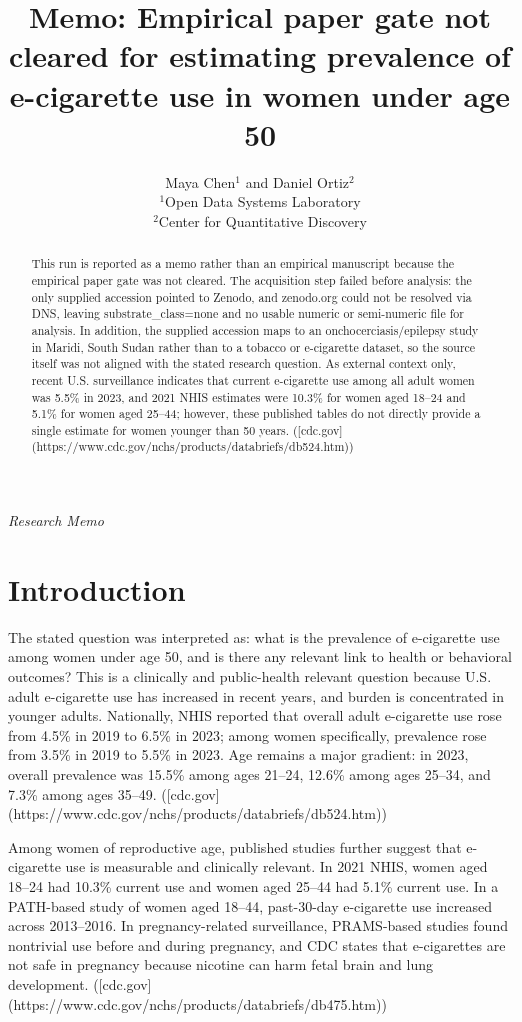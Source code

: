 \documentclass[11pt]{article}
\title{Memo: Empirical paper gate not cleared for estimating prevalence of e-cigarette use in women under age 50}
\author{Maya Chen$^{1}$ and Daniel Ortiz$^{2}$\\$^{1}$Open Data Systems Laboratory\\$^{2}$Center for Quantitative Discovery}
\date{}
\begin{document}
\maketitle

\begin{center}\small\textit{Research Memo}\end{center}

\begin{abstract}

This run is reported as a memo rather than an empirical manuscript because the empirical paper gate was not cleared. The acquisition step failed before analysis: the only supplied accession pointed to Zenodo, and zenodo.org could not be resolved via DNS, leaving substrate\_class=none and no usable numeric or semi-numeric file for analysis. In addition, the supplied accession maps to an onchocerciasis/epilepsy study in Maridi, South Sudan rather than to a tobacco or e-cigarette dataset, so the source itself was not aligned with the stated research question. As external context only, recent U.S. surveillance indicates that current e-cigarette use among all adult women was 5.5\% in 2023, and 2021 NHIS estimates were 10.3\% for women aged 18–24 and 5.1\% for women aged 25–44; however, these published tables do not directly provide a single estimate for women younger than 50 years. ([cdc.gov](https://www.cdc.gov/nchs/products/databriefs/db524.htm))

\end{abstract}

\section{Introduction}
The stated question was interpreted as: what is the prevalence of e-cigarette use among women under age 50, and is there any relevant link to health or behavioral outcomes? This is a clinically and public-health relevant question because U.S. adult e-cigarette use has increased in recent years, and burden is concentrated in younger adults. Nationally, NHIS reported that overall adult e-cigarette use rose from 4.5\% in 2019 to 6.5\% in 2023; among women specifically, prevalence rose from 3.5\% in 2019 to 5.5\% in 2023. Age remains a major gradient: in 2023, overall prevalence was 15.5\% among ages 21–24, 12.6\% among ages 25–34, and 7.3\% among ages 35–49. ([cdc.gov](https://www.cdc.gov/nchs/products/databriefs/db524.htm))

Among women of reproductive age, published studies further suggest that e-cigarette use is measurable and clinically relevant. In 2021 NHIS, women aged 18–24 had 10.3\% current use and women aged 25–44 had 5.1\% current use. In a PATH-based study of women aged 18–44, past-30-day e-cigarette use increased across 2013–2016. In pregnancy-related surveillance, PRAMS-based studies found nontrivial use before and during pregnancy, and CDC states that e-cigarettes are not safe in pregnancy because nicotine can harm fetal brain and lung development. ([cdc.gov](https://www.cdc.gov/nchs/products/databriefs/db475.htm))
\end{document}
